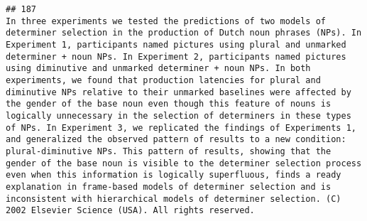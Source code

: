 \documentclass[
  english,
  man]{apa6}
\begin{document}
\begin{verbatim}
## 187                                                                                                                                                                                                                                                                                                                                                                                                                                                                                                                                                                                                                                                                                                                                                                                                                                                                                                                                                                                                                                                                                                                                                                                                                                                                                                                                                                                                                                                                                                         In three experiments we tested the predictions of two models of determiner selection in the production of Dutch noun phrases (NPs). In Experiment 1, participants named pictures using plural and unmarked determiner + noun NPs. In Experiment 2, participants named pictures using diminutive and unmarked determiner + noun NPs. In both experiments, we found that production latencies for plural and diminutive NPs relative to their unmarked baselines were affected by the gender of the base noun even though this feature of nouns is logically unnecessary in the selection of determiners in these types of NPs. In Experiment 3, we replicated the findings of Experiments 1, and generalized the observed pattern of results to a new condition: plural-diminutive NPs. This pattern of results, showing that the gender of the base noun is visible to the determiner selection process even when this information is logically superfluous, finds a ready explanation in frame-based models of determiner selection and is inconsistent with hierarchical models of determiner selection. (C) 2002 Elsevier Science (USA). All rights reserved.

\end{verbatim}
\end{document}
